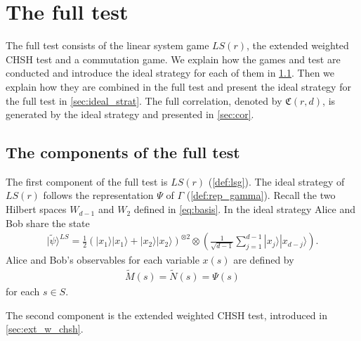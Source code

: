 \documentclass[11pt,letterpaper]{article}
\newcommand{\ket}[1]{|#1\rangle}
\newcommand{\x}{\otimes}
\newcommand{\1}{\mathbb{1}}
\newcommand{\LS}{LS}
\newcommand{\tM}{\tilde{M}}
\newcommand{\tN}{\tilde{N}}
\newcommand{\tpsi}{\tilde{\psi}}
\newcommand{\fC}{\mathfrak{C}}
\theoremstyle{definition}
\begin{document}

\section{The full test}
\label{sec:full_test}
The full test consists of the linear system game $\LS(r)$,
the extended weighted CHSH test and a commutation game. We explain how the games and test are conducted and
introduce the ideal strategy for each of them in \cref{sec:tests}. 
Then we explain how they are combined in the full test and present the ideal strategy for the full test in \cref{sec:ideal_strat}. The full correlation, denoted by $\fC(r,d)$, is generated by the ideal strategy and presented in \cref{sec:cor}.

\subsection{The components of the full test}
\label{sec:tests}

The first component of the full test is $\LS(r)$ (\cref{def:lsg}).
The ideal strategy of $\LS(r)$ follows the representation $\Psi$ of $\Gamma$ (\cref{def:rep_gamma}).
Recall the two Hilbert spaces $W_{d-1}$ and $W_2$ defined in \cref{eq:basis}. 
In the ideal strategy Alice and Bob share the state 
\begin{align}
    \label{eq:ideal_st_ls}
        \ket{\tpsi}^{\LS} = \frac{1}{2} (\ket{x_1}\ket{x_1} + \ket{x_2}\ket{x_2})^{\x 2} \x \left(\frac{1}{\sqrt{d-1}} \sum_{j=1}^{d-1} \ket{x_j}\ket{x_{d-j}}\right).
\end{align}
Alice and Bob's observables for each variable $x(s)$ are
defined by
\begin{align*}
    \tM(s) = \tN(s) = \Psi(s) 
\end{align*}
for each $s \in S$.


The second component is the extended weighted CHSH test, introduced in \cref{sec:ext_w_chsh}.
\end{document}
